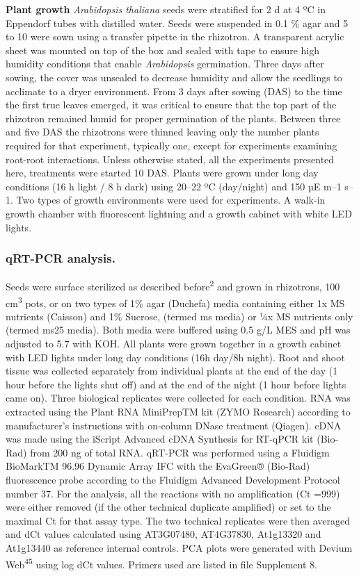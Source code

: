\documentclass[]{article}
\begin{document}
\textbf{Plant growth} \emph{Arabidopsis thaliana} seeds were stratified
for 2 d at 4 ºC in Eppendorf tubes with distilled water. Seeds were
suspended in 0.1 \% agar and 5 to 10 were sown using a transfer pipette
in the rhizotron. A transparent acrylic sheet was mounted on top of the
box and sealed with tape to ensure high humidity conditions that enable
\emph{Arabidopsis} germination. Three days after sowing, the cover was
unsealed to decrease humidity and allow the seedlings to acclimate to a
dryer environment. From 3 days after sowing (DAS) to the time the first
true leaves emerged, it was critical to ensure that the top part of the
rhizotron remained humid for proper germination of the plants. Between
three and five DAS the rhizotrons were thinned leaving only the number
plants required for that experiment, typically one, except for
experiments examining root-root interactions. Unless otherwise stated,
all the experiments presented here, treatments were started 10 DAS.
Plants were grown under long day conditions (16 h light / 8 h dark)
using 20--22 ºC (day/night) and 150 µE m--1 s--1. Two types of growth
environments were used for experiments. A walk-in growth chamber with
fluorescent lightning and a growth cabinet with white LED lights.

\subsubsection{qRT-PCR analysis.}\label{qrt-pcr-analysis.}

Seeds were surface sterilized as described before\textsuperscript{2} and
grown in rhizotrons, 100 cm\textsuperscript{3} pots, or on two types of
1\% agar (Duchefa) media containing either 1x MS nutrients (Caisson) and
1\% Sucrose, (termed ms media) or ¼x MS nutrients only (termed ms25
media). Both media were buffered using 0.5 g/L MES and pH was adjusted
to 5.7 with KOH. All plants were grown together in a growth cabinet with
LED lights under long day conditions (16h day/8h night). Root and shoot
tissue was collected separately from individual plants at the end of the
day (1 hour before the lights shut off) and at the end of the night (1
hour before lights came on). Three biological replicates were collected
for each condition. RNA was extracted using the Plant RNA MiniPrepTM kit
(ZYMO Research) according to manufacturer's instructions with on-column
DNase treatment (Qiagen). cDNA was made using the iScript Advanced cDNA
Synthesis for RT-qPCR kit (Bio-Rad) from 200 ng of total RNA. qRT-PCR
was performed using a Fluidigm BioMarkTM 96.96 Dynamic Array IFC with
the EvaGreen® (Bio-Rad) fluorescence probe according to the Fluidigm
Advanced Development Protocol number 37. For the analysis, all the
reactions with no amplification (Ct =999) were either removed (if the
other technical duplicate amplified) or set to the maximal Ct for that
assay type. The two technical replicates were then averaged and dCt
values calculated using AT3G07480, AT4G37830, At1g13320 and At1g13440 as
reference internal controls. PCA plots were generated with Devium
Web\textsuperscript{45} using log dCt values. Primers used are listed in
file Supplement 8.
\end{document}
